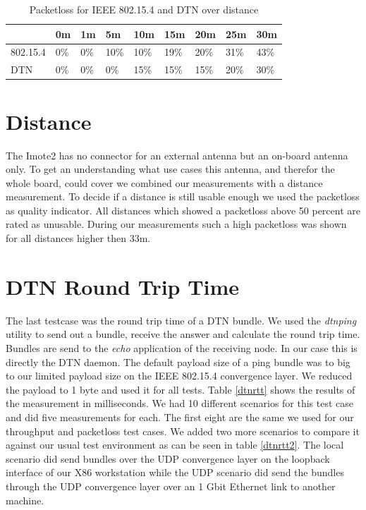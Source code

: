 \begin{table}
\begin{tabular}{lllllllll}
    & 0m & 1m & 5m & 10m & 15m & 20m & 25m & 30m \\
\hline
802.15.4 & 0\% & 0\% & 10\% & 10\% & 19\% & 20\% & 31\% & 43\% \\
DTN & 0\% & 0\% & 0\% & 15\% & 15\% & 15\% & 20\% & 30\% \\
\end{tabular}
\caption{Packetloss for IEEE 802.15.4 and DTN over distance}
\label{tableloss}
\end{table}

\section{Distance}
The Imote2 has no connector for an external antenna but an on-board antenna
only. To get an understanding what use cases this antenna, and therefor the
whole board, could cover we combined our measurements with a distance
measurement. To decide if a distance is still usable enough we used the
packetloss as quality indicator. All distances which showed a packetloss above
50 percent are rated as unusable. During our measurements such a high packetloss
was shown for all distances higher then 33m.

\section{DTN Round Trip Time}
The last testcase was the round trip time of a DTN bundle. We used the
\emph{dtnping} utility to send out a bundle, receive the answer and calculate
the round trip time. Bundles are send to the \emph{echo} application of the
receiving node. In our case this is directly the DTN daemon. The default payload
size of a ping bundle was to big to our limited payload size on the IEEE
802.15.4 convergence layer. We reduced the payload to 1 byte and used it for all
tests. Table \ref{dtnrtt} shows the results of the measurement in milliseconds. We
had 10 different scenarios for this test case and did five measurements for each.
The first eight are the same we used for our throughput and packetloss test cases.
We added two more scenarios to compare it against our usual test environment as
can be seen in table \ref{dtnrtt2}. The
local scenario did send bundles over the UDP convergence layer on the loopback
interface of our X86 workstation while the UDP scenario did send the bundles
through the UDP convergence layer over an 1 Gbit Ethernet link to another
machine.

